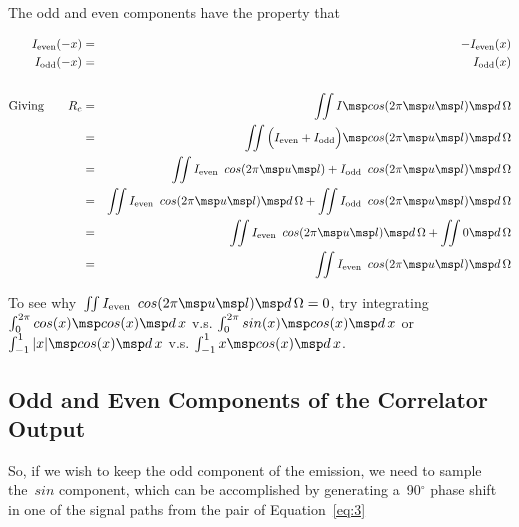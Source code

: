 The odd and even components have the property that

\begin{eqnarray}
  \label{eq:13}
  I_{\mbox{\scriptsize even}}(-x) &=& -I_{\mbox{\scriptsize even}}(x) \nonumber \\
  I_{\mbox{\scriptsize odd}}(-x)  &=&  I_{\mbox{\scriptsize odd}}(x) \nonumber \\
                                                              \nonumber \\
      \mbox{Giving} \qquad R_c &=& \iint I \msp cos(2\pi \msp u \msp l) \msp d\,\Omega \nonumber \\
                               &=& \iint \Big (I_{\mbox{\scriptsize even}} +  I_{\mbox{\scriptsize odd}} \Big ) \msp cos(2\pi \msp u \msp l) \msp d\,\Omega \nonumber \\
                               &=& \iint I_{\mbox{\scriptsize even}} \enspace cos(2\pi \msp u \msp l) + I_{\mbox{\scriptsize odd}} \enspace cos(2\pi \msp u \msp l) \msp d\,\Omega \nonumber \\
                               &=& \iint I_{\mbox{\scriptsize even}} \enspace cos(2\pi \msp u \msp l) \msp d\,\Omega + \iint I_{\mbox{\scriptsize odd}} \enspace cos(2\pi \msp u \msp l) \msp d\,\Omega \nonumber \\
                               &=& \iint I_{\mbox{\scriptsize even}} \enspace cos(2\pi \msp u \msp l) \msp d\,\Omega + \iint 0 \msp d\,\Omega \nonumber \\
                               &=& \iint I_{\mbox{\scriptsize even}} \enspace cos(2\pi \msp u \msp l) \msp d\,\Omega \nonumber
\end{eqnarray}

\begin{braced}
 To see why~$\iint I_{\mbox{\scriptsize even}} \enspace cos(2\pi \msp u \msp l) \msp d\,\Omega = 0$, try integrating $\int_{0}^{2\pi }cos(x)\msp cos(x) \msp d\,x$ v.s. $\int_{0}^{2\pi }sin(x)\msp cos(x) \msp d\,x$ or $\int_{-1}^{1}|x| \msp cos(x) \msp d\,x$ v.s. $\int_{-1}^{1} x \msp cos(x) \msp d\,x$.\\
\end{braced}

\subsection{Odd and Even Components of the Correlator Output}
So, if we wish to keep the odd component of the emission, we need to sample the~$sin$ component, which can be accomplished by generating a~90$^\circ $ phase shift in one of the signal paths from the pair of Equation~\eqref{eq:3}

